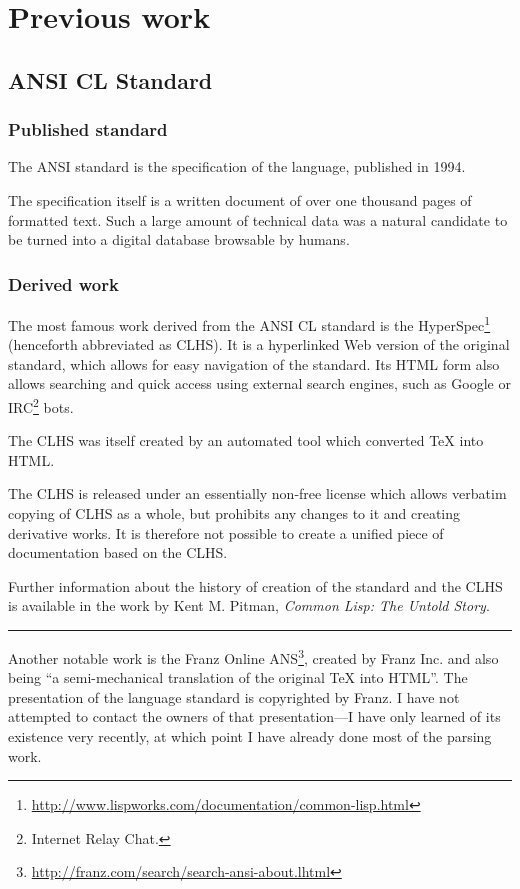 \section{Previous work}

\subsection{ANSI CL Standard}

\subsubsection{Published standard}

The ANSI \cl{} standard\cite{ANSI:1994:standard} is the specification of the \cl{} language, published in 1994.

The specification itself is a written document of over one thousand pages of formatted text. Such a large amount of technical data was a natural candidate to be turned into a digital database browsable by humans.
\subsubsection{Derived work}
The most famous work derived from the ANSI CL standard is the \cl{} HyperSpec\footnote{\url{http://www.lispworks.com/documentation/common-lisp.html}} (henceforth abbreviated as CLHS). It is a hyperlinked Web version of the original standard, which allows for easy navigation of the standard. Its HTML form also allows searching and quick access using external search engines, such as Google or IRC\footnote{Internet Relay Chat.} bots.

The CLHS was itself created by an automated tool which converted TeX into HTML.

The CLHS is released under an essentially non-free license which allows verbatim copying of CLHS as a whole, but prohibits any changes to it and creating derivative works. It is therefore not possible to create a unified piece of \cl{} documentation based on the CLHS.

Further information about the history of creation of the standard and the CLHS is available in the work by Kent M. Pitman, \textit{Common Lisp: The Untold Story}\cite{kmp:2012:untold}.

\noindent\rule{\linewidth}{0.5pt}

Another notable work is the Franz Online ANS\footnote{\url{
http://franz.com/search/search-ansi-about.lhtml}}, created by Franz Inc. and also being ``a semi-mechanical translation of the original TeX into HTML''. The presentation of the language standard is copyrighted by Franz. I have not attempted to contact the owners of that presentation---I have only learned of its existence very recently, at which point I have already done most of the parsing work.


